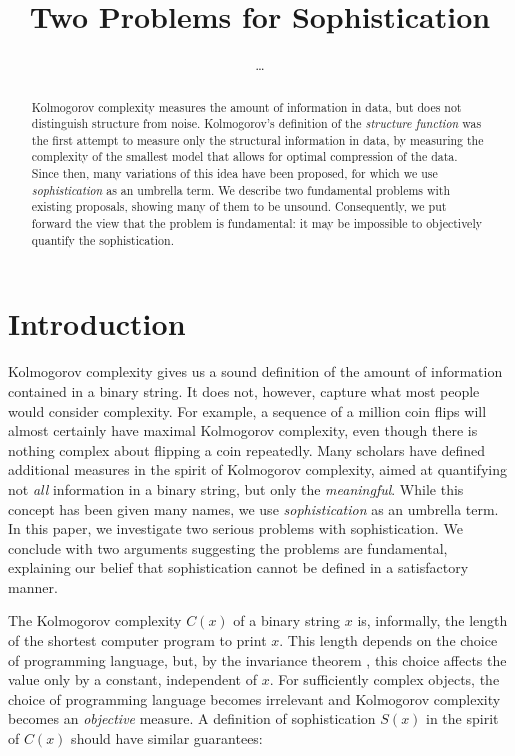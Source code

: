 \documentclass{style/llncs}
\title{Two Problems for Sophistication}
\author{\ldots}
\begin{document}
 
\maketitle

\begin{abstract}
Kolmogorov complexity measures the amount of information in data, but does not distinguish structure from noise. Kolmogorov's definition of the \emph{structure function} was the first attempt to measure only the structural information in data, by measuring the complexity of the smallest model that allows for optimal compression of the data. Since then, many variations of this idea have been proposed, for which we use \emph{sophistication} as an umbrella term. We describe two fundamental problems with existing proposals, showing many of them to be unsound. Consequently, we put forward the view that the problem is fundamental: it may be impossible to objectively quantify the sophistication.
\end{abstract}

\section{Introduction}
\enlargethispage{2\baselineskip}

Kolmogorov complexity gives us a sound definition of the amount of information contained in a binary string. It does not, however, capture what most people would consider complexity. For example, a sequence of a million coin flips will almost certainly have maximal Kolmogorov complexity, even though there is nothing complex about flipping a coin repeatedly. Many scholars have defined additional measures in the spirit of Kolmogorov complexity, aimed at quantifying not \emph{all} information in a binary string, but only the \emph{meaningful}. While this concept has been given many names, we use \emph{sophistication} as an umbrella term. In this paper, we investigate two serious problems with sophistication. We conclude with two arguments suggesting the problems are fundamental, explaining our belief that sophistication cannot be defined in a satisfactory manner.

The Kolmogorov complexity $C(x)$ of a binary string $x$ is, informally, the length of the shortest computer program to print $x$. This length depends on the choice of programming language, but, by the invariance theorem \cite[Section~2.1]{li1993introduction}, this choice affects the value only by a constant, independent of $x$. For sufficiently complex objects, the choice of programming language becomes irrelevant and Kolmogorov complexity becomes an \emph{objective} measure. A definition of sophistication $S(x)$ in the spirit of $C(x)$ should have similar guarantees:
\end{document}

